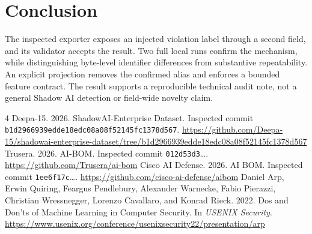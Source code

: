 \documentclass[sigconf,nonacm]{acmart}
\begin{document}
\section{Conclusion}
The inspected exporter exposes an injected violation label through a second field, and its validator accepts the result. Two full local runs confirm the mechanism, while distinguishing byte-level identifier differences from substantive repeatability. An explicit projection removes the confirmed alias and enforces a bounded feature contract. The result supports a reproducible technical audit note, not a general Shadow AI detection or field-wide novelty claim.

\begin{thebibliography}{4}
 Deepa-15. 2026. ShadowAI-Enterprise Dataset. Inspected commit \texttt{b1d2966939edde18edc08a08f52145fc1378d567}. \url{https://github.com/Deepa-15/shadowai-enterprise-dataset/tree/b1d2966939edde18edc08a08f52145fc1378d567}
 Trusera. 2026. AI-BOM. Inspected commit \texttt{012d53d3}\ldots. \url{https://github.com/Trusera/ai-bom}
 Cisco AI Defense. 2026. AI BOM. Inspected commit \texttt{1ee6f17c}\ldots. \url{https://github.com/cisco-ai-defense/aibom}
 Daniel Arp, Erwin Quiring, Feargus Pendlebury, Alexander Warnecke, Fabio Pierazzi, Christian Wressnegger, Lorenzo Cavallaro, and Konrad Rieck. 2022. Dos and Don'ts of Machine Learning in Computer Security. In \emph{USENIX Security}. \url{https://www.usenix.org/conference/usenixsecurity22/presentation/arp}
\end{thebibliography}
\end{document}
